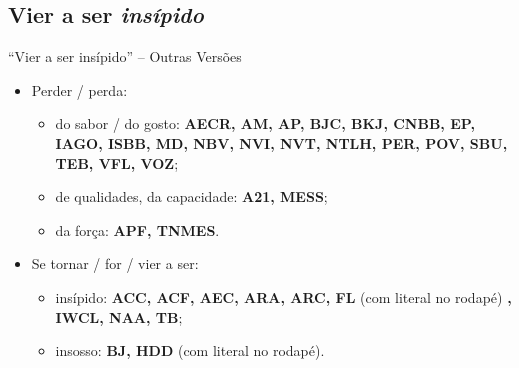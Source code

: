 \documentclass[12pt,aspectratio=169]{beamer}
\newcommand{\YEL}[1]{{\textcolor{TXyel}{#1}}}
\newcommand{\MAG}[1]{{\textcolor{TXmag}{#1}}}
\newcommand{\BRI}[1]{{\textcolor{BSpbg}{#1}}}   %
\begin{document}
    \subsection{Vier a ser \textit{insípido\/}}

    \begin{frame}{\BRI{``Vier a ser insípido''} -- Outras Versões}
        \begin{itemize}
            \item<1-> \YEL{Perder} / \YEL{perda}:
                \begin{itemize}
                    \item \YEL{do sabor} / \YEL{do gosto}:
                        \BRI{\textbf{AECR, AM, AP, BJC, BKJ, CNBB, EP, IAGO, ISBB, MD, NBV, NVI,
                            NVT, NTLH, PER, POV, SBU, TEB, VFL, VOZ}};
                    \item \YEL{de qualidades, da capacidade}:
                        \BRI{\textbf{A21, MESS}};
                    \item \YEL{da força}:
                        \BRI{\textbf{APF, TNMES}}.
                \end{itemize}
            \item<2-> \YEL{Se tornar} / \YEL{for} / \YEL{vier a ser}:
                \begin{itemize}
                    \item \YEL{insípido}:
                        \BRI{\textbf{ACC, ACF, AEC, ARA, ARC, FL}} (com \MAG{literal} no rodapé)%
                        \BRI{\textbf{, IWCL, NAA, TB}};
                    \item \YEL{insosso}:
                        \BRI{\textbf{BJ, HDD}} (com \MAG{literal} no rodapé).
                \end{itemize}
        \end{itemize}
    \end{frame}
\end{document}

